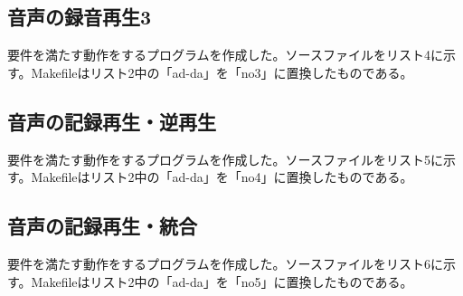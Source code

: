 \documentclass{jarticle}
\begin{document}
\subsection{音声の録音再生3}
要件を満たす動作をするプログラムを作成した。ソースファイルをリスト4に示す。Makefileはリスト2中の「ad-da」を「no3」に置換したものである。

\subsection{音声の記録再生・逆再生}
要件を満たす動作をするプログラムを作成した。ソースファイルをリスト5に示す。Makefileはリスト2中の「ad-da」を「no4」に置換したものである。

\subsection{音声の記録再生・統合}
要件を満たす動作をするプログラムを作成した。ソースファイルをリスト6に示す。Makefileはリスト2中の「ad-da」を「no5」に置換したものである。
\end{document}
